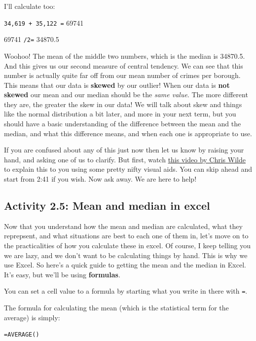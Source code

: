 \documentclass[
]{book}
\begin{document}
I'll calculate too:

\texttt{34,619\ +\ 35,122\ =} 69741

69741 \texttt{/2=} 34870.5

Woohoo! The mean of the middle two numbers, which is the median is 34870.5. And this gives us our second measure of central tendency. We can see that this number is actually quite far off from our mean number of crimes per borough. This means that our data is \textbf{skewed} by our outlier! When our data is \textbf{not skewed} our mean and our median should be the \emph{same value}. The more different they are, the greater the skew in our data! We will talk about skew and things like the normal distribution a bit later, and more in your next term, but you should have a basic understanding of the difference between the mean and the median, and what this difference means, and when each one is appropriate to use.

If you are confused about any of this just now then let us know by raising your hand, and asking one of us to clarify. But first, watch \href{https://www.youtube.com/watch?v=U3lk2nQYfAQ\&amp=\&list=PL8CRAVedURQrlxeFfme0TEgaj1_h67JUR\&amp=\&index=4}{this video by Chris Wilde} to explain this to you using some pretty nifty visual aids. You can skip ahead and start from 2:41 if you wish. Now ask away. We are here to help!

\hypertarget{activity-2.5-mean-and-median-in-excel}{%
\subsection{Activity 2.5: Mean and median in excel}\label{activity-2.5-mean-and-median-in-excel}}

Now that you understand how the mean and median are calculated, what they reprepsent, and what situations are best to each one of them in, let's move on to the practicalities of how you calculate these in excel. Of course, I keep telling you we are lazy, and we don't want to be calculating things by hand. This is why we use Excel. So here's a quick guide to getting the mean and the median in Excel. It's easy, but we'll be using \textbf{formulas}.

You can set a cell value to a formula by starting what you write in there with \texttt{=}.

The formula for calculating the mean (which is the statistical term for the average) is simply:

\texttt{=AVERAGE()}
\end{document}

